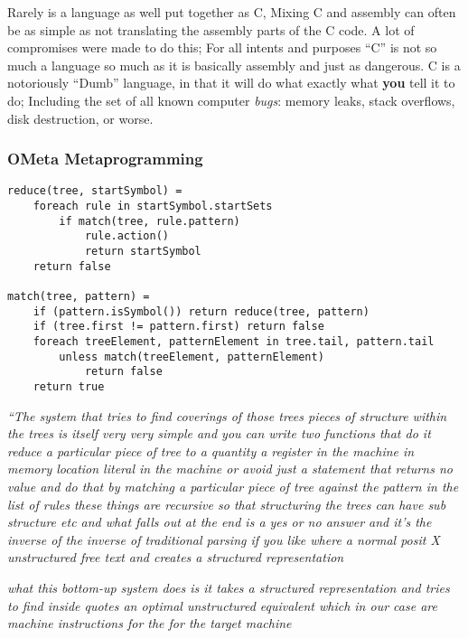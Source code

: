 Rarely is a language as well put together as C, Mixing C and assembly
can often be as simple as not translating the assembly parts of the C
code. A lot of compromises were made to do this; For all intents and
purposes ``C'' is not so much a language so much as it is basically
assembly and just as dangerous. C is a notoriously ``Dumb'' language, in
that it will do what exactly what \textbf{you} tell it to do; Including
the set of all known computer \emph{bugs}: memory leaks, stack
overflows, disk destruction, or worse.

\hypertarget{ometa-metaprogramming}{%
\subsubsection{\texorpdfstring{\textbf{OMeta}
Metaprogramming}{OMeta Metaprogramming}}\label{ometa-metaprogramming}}

\begin{verbatim}
reduce(tree, startSymbol) =
    foreach rule in startSymbol.startSets
        if match(tree, rule.pattern)
            rule.action()
            return startSymbol
    return false

match(tree, pattern) =
    if (pattern.isSymbol()) return reduce(tree, pattern)
    if (tree.first != pattern.first) return false
    foreach treeElement, patternElement in tree.tail, pattern.tail
        unless match(treeElement, patternElement)
            return false
    return true
\end{verbatim}

\emph{``The system that tries to find coverings of those trees pieces of
structure within the trees is itself very very simple and you can write
two functions that do it reduce a particular piece of tree to a quantity
a register in the machine in memory location literal in the machine or
avoid just a statement that returns no value and do that by matching a
particular piece of tree against the pattern in the list of rules these
things are recursive so that structuring the trees can have sub
structure etc and what falls out at the end is a yes or no answer and
it's the inverse of the inverse of traditional parsing if you like where
a normal posit X unstructured free text and creates a structured
representation}

\emph{what this bottom-up system does is it takes a structured
representation and tries to find inside quotes an optimal unstructured
equivalent which in our case are machine instructions for the for the
target machine}

